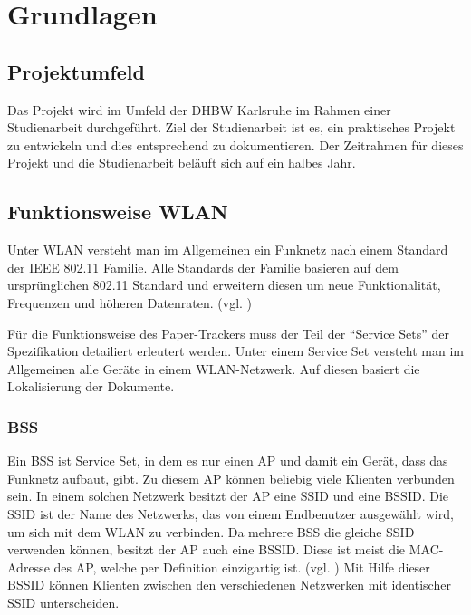 \chapter{Grundlagen}

\section{Projektumfeld}

Das Projekt wird im Umfeld der \gls{DHBW} Karlsruhe im Rahmen einer Studienarbeit durchgeführt.
Ziel der Studienarbeit ist es, ein praktisches Projekt zu entwickeln und dies entsprechend zu dokumentieren.
Der Zeitrahmen für dieses Projekt und die Studienarbeit beläuft sich auf ein halbes Jahr.

\section{Funktionsweise \gls{WLAN}} \label{sec:grundlagen-wlan}

Unter \gls{WLAN} versteht man im Allgemeinen ein Funknetz nach einem Standard der \gls{IEEE} 802.11 Familie.
Alle Standards der Familie basieren auf dem ursprünglichen 802.11 Standard und erweitern diesen um neue Funktionalität, Frequenzen und höheren Datenraten.
(vgl. \cite{Schnabel2020})

Für die Funktionsweise des Paper-Trackers muss der Teil der \enquote{Service Sets} der Spezifikation detailiert erleutert werden.
Unter einem Service Set versteht man im Allgemeinen alle Geräte in einem \gls{WLAN}-Netzwerk.
Auf diesen basiert die Lokalisierung der Dokumente.

\subsection{\gls{BSS}}

Ein \gls{BSS} ist Service Set, in dem es nur einen \gls{AP} und damit ein Gerät, dass das Funknetz aufbaut, gibt.
Zu diesem \gls{AP} können beliebig viele Klienten verbunden sein.
In einem solchen Netzwerk besitzt der \gls{AP} eine \gls{SSID} und eine \gls{BSSID}.
Die \gls{SSID} ist der Name des Netzwerks, das von einem Endbenutzer ausgewählt wird, um sich mit dem \gls{WLAN} zu verbinden.
Da mehrere \gls{BSS} die gleiche \gls{SSID} verwenden können, besitzt der \gls{AP} auch eine \gls{BSSID}.
Diese ist meist die \gls{MAC}-Adresse des \gls{AP}, welche per Definition einzigartig ist.
(vgl. \cite{Luber2018})
Mit Hilfe dieser \gls{BSSID} können Klienten zwischen den verschiedenen Netzwerken mit identischer \gls{SSID} unterscheiden.

